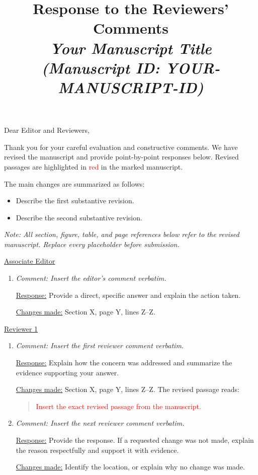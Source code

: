 \documentclass[12pt]{article}
\begin{document}
\date{}
\author{}
\title{{\Large\bf Response to the Reviewers' Comments} \\
{\small\em Your Manuscript Title} \\
{\small\em (Manuscript ID: YOUR-MANUSCRIPT-ID)}}
\maketitle
\vspace{-0.3in}

Dear Editor and Reviewers,

Thank you for your careful evaluation and constructive comments.
We have revised the manuscript and provide point-by-point responses below.
Revised passages are highlighted in \textcolor{red}{red} in the marked manuscript.

The main changes are summarized as follows:
\begin{itemize}
  \item Describe the first substantive revision.
  \item Describe the second substantive revision.
\end{itemize}
\emph{Note: All section, figure, table, and page references below refer to
the revised manuscript. Replace every placeholder before submission.}

\newpage
\underline{Associate Editor}
\begin{enumerate}
\item \emph{Comment: Insert the editor's comment verbatim.}

\underline{Response:} Provide a direct, specific answer and explain the action taken.

\underline{Changes made:} Section X, page Y, lines Z--Z.
\end{enumerate}

\newpage
\underline{Reviewer 1}
\begin{enumerate}
\item \emph{Comment: Insert the first reviewer comment verbatim.}

\underline{Response:} Explain how the concern was addressed and summarize
the evidence supporting your answer.

\underline{Changes made:} Section X, page Y, lines Z--Z.
The revised passage reads:
\begin{quote}
\textcolor{red}{Insert the exact revised passage from the manuscript.}
\end{quote}

\item \emph{Comment: Insert the next reviewer comment verbatim.}

\underline{Response:} Provide the response. If a requested change was not
made, explain the reason respectfully and support it with evidence.

\underline{Changes made:} Identify the location, or explain why no change was made.
\end{enumerate}
\end{document}
